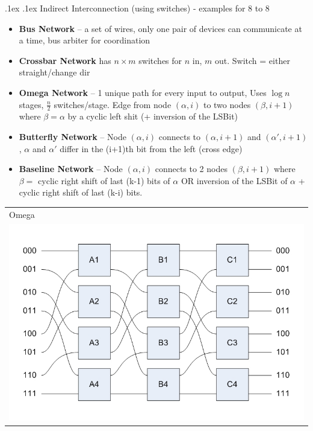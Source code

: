 \documentclass[10pt,landscape,a4paper]{article}
\makeatletter
\renewcommand{\subsubsection}{\@startsection{subsubsection}{1}{0mm}%
  {.1ex}%
  {.1ex}%
{\rmfamily\bfseries}}
\makeatother
\begin{document}
\begin{multicols*}{4}
  \subsubsection{Indirect Interconnection (using switches) - examples for 8 to 8}
  \begin{itemize}
    \item \textbf{Bus Network} -- a set of wires, only one pair of devices can communicate at a time, bus arbiter for coordination
    \item \textbf{Crossbar Network} has $n\times m$ switches for $n$ in, $m$ out. Switch = either straight/change dir
    \item \textbf{Omega Network} -- 1 unique path for every input to output, Uses $\log n$ stages, $\frac{n}{2}$ switches/stage. Edge from node $(\alpha, i)$ to two nodes $(\beta, i + 1)$ where $\beta = \alpha$ by a cyclic left shit (+ inversion of the LSBit)
    \item \textbf{Butterfly Network} -- Node $(\alpha, i)$ connects to $(\alpha, i + 1)$ and $(\alpha', i + 1)$, $\alpha$ and $\alpha'$ differ in the (i+1)th bit from the left (cross edge)
    \item \textbf{Baseline Network} -- Node $(\alpha, i)$ connects to 2 nodes $(\beta, i + 1)$ where $\beta = $ cyclic right shift of last (k-1) bits of $\alpha$ OR inversion of the LSBit of $\alpha$ + cyclic right shift of last (k-i) bits.
  \end{itemize}
  \begin{tabularx}{0.35\linewidth}{X}
    Omega\\
    \includegraphics[width=\linewidth]{omega}
  \end{tabularx}
  \begin{tabularx}{0.3\linewidth}{X}

\end{tabularx}
\end{multicols*}
\end{document}
